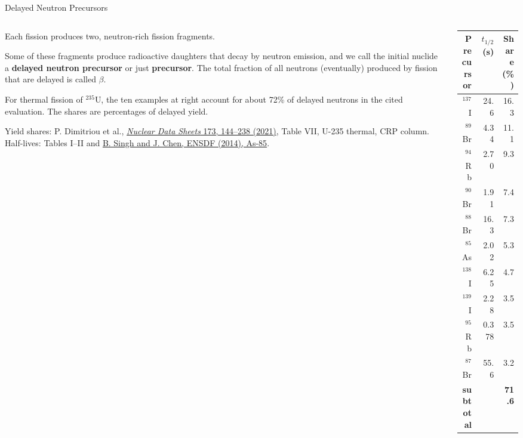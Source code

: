 \documentclass[aspectratio=1610]{beamer}
\begin{document}
\begin{frame}[fragile]{Delayed Neutron Precursors}
\small

\begin{columns}[T]

\begin{column}{0.48\textwidth}
   
Each fission produces two, neutron-rich fission fragments.
\vspace{0.15cm}

Some of these fragments produce radioactive daughters that decay by neutron emission, and we call the initial nuclide a {\bf delayed neutron precursor}  or just {\bf precursor}.  The total fraction of all neutrons (eventually) produced by fission that are delayed is called $\beta$.

\vspace{0.15cm}


For thermal fission of ${}^{235}$U, the ten examples at right account for
about 72\% of delayed neutrons in the cited evaluation.
The shares are percentages of delayed yield.

\vspace{0.15cm}
{\scriptsize Yield shares: P. Dimitriou et al.,
\href{https://doi.org/10.1016/j.nds.2021.04.006}
{\emph{Nuclear Data Sheets} 173, 144--238 (2021)}, Table VII,
U-235 thermal, CRP column. Half-lives: Tables I--II and
\href{https://www.nndc.bnl.gov/ensnds/85/Se/beta_decay_2.021_s.pdf}
{B. Singh and J. Chen, ENSDF (2014), As-85}.}

\end{column}
  
\begin{column}{0.48\textwidth}

\begin{table}[h!]
\begin{tabular}{rrr}
\toprule
\textbf{Precursor} & \textbf{$t_{1/2}$ (s)}  & \textbf{Share (\%)} \\
\midrule
$^{137}$I  & 24.6  & 16.3 \\
$^{89}$Br  & 4.34  & 11.1 \\
$^{94}$Rb  & 2.70  & 9.3 \\
$^{90}$Br  & 1.91  & 7.4 \\
$^{88}$Br  & 16.3  & 7.3 \\
$^{85}$As  & 2.02  & 5.3 \\
$^{138}$I  & 6.25  & 4.7 \\
$^{139}$I  & 2.28  & 3.5 \\
$^{95}$Rb  & 0.378 & 3.5 \\
$^{87}$Br  & 55.6  & 3.2 \\
\midrule 
\textbf{subtotal} &  & \textbf{71.6} \\
\bottomrule
\end{tabular}
\end{table}

\end{column}

\end{columns}
  
\end{frame}
\end{document}
